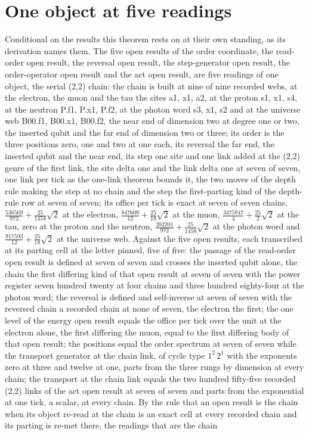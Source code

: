 \section{One object at five readings}\label{mod:III-1-D543458-tkro-t1}
\begin{chconditional}\label{box:III-1-D543458-tkro-t1:1}
Conditional on the results this theorem rests on at their own standing, as its derivation names them.
The five open results of the order coordinate, the read-order open result, the reversal open result, the step-generator open result, the order-operator open result and the act open result, are five readings of one object, the serial (2,2) chain: the chain is built at nine of nine recorded webs, at the electron, the muon and the tau the sites a1, x1, a2, at the proton s1, x1, s4, at the neutron P.f1, P.x1, P.f2, at the photon word s3, x1, s2 and at the universe web B00.f1, B00.x1, B00.f2, the near end of dimension two at degree one or two, the inserted qubit and the far end of dimension two or three; its order is the three positions zero, one and two at one each, its reversal the far end, the inserted qubit and the near end, its step one site and one link added at the (2,2) genre of the first link, the site delta one and the link delta one at seven of seven, one link per tick as the one-link theorem bounds it, the two moves of the depth rule making the step at no chain and the step the first-parting kind of the depth-rule row at seven of seven; its office per tick is exact at seven of seven chains, $\tfrac{536569}{972} + \tfrac{25}{1458}\sqrt{2}$ at the electron, $\tfrac{847609}{12} + \tfrac{25}{18}\sqrt{2}$ at the muon, $\tfrac{3475947}{4} + \tfrac{25}{2}\sqrt{2}$ at the tau, zero at the proton and the neutron, $\tfrac{202201}{972} + \tfrac{25}{1458}\sqrt{2}$ at the photon word and $\tfrac{917593}{12} + \tfrac{25}{18}\sqrt{2}$ at the universe web. Against the five open results, each transcribed at its parting cell at the letter pinned, five of five: the passage of the read-order open result is defined at seven of seven and crosses the inserted qubit alone, the chain the first differing kind of that open result at seven of seven with the power register seven hundred twenty at four chains and three hundred eighty-four at the photon word; the reversal is defined and self-inverse at seven of seven with the reversed chain a recorded chain at none of seven, the electron the first; the one level of the energy open result equals the office per tick over the unit at the electron alone, the first differing the muon, equal to the first differing body of that open result; the positions equal the order spectrum at seven of seven while the transport generator at the chain link, of cycle type $1^{2}\,2^{1}$ with the exponents zero at three and twelve at one, parts from the three rungs by dimension at every chain; the transport at the chain link equals the two hundred fifty-five recorded (2,2) links of the act open result at seven of seven and parts from the exponential at one tick, a scalar, at every chain. By the rule that an open result is the chain when its object re-read at the chain is an exact cell at every recorded chain and its parting is re-met there, the readings that are the chain 
\end{chconditional}
